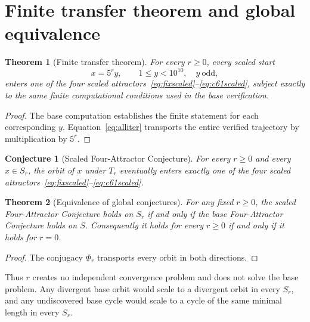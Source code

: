 \documentclass[11pt]{article}
\newtheorem{theorem}{Theorem}
\newtheorem{conjecture}{Conjecture}
\begin{document}
\section{Finite transfer theorem and global equivalence}
\begin{theorem}[Finite transfer theorem]
For every $r\ge0$, every scaled start
\[
x=5^ry,\qquad 1\le y<10^{10},\quad y\ \mathrm{odd},
\]
enters one of the four scaled attractors~\eqref{eq:fixscaled}--\eqref{eq:c61scaled}, subject exactly to the same finite computational conditions used in the base verification.
\end{theorem}
\begin{proof}
The base computation establishes the finite statement for each corresponding $y$. Equation~\eqref{eq:alliter} transports the entire verified trajectory by multiplication by $5^r$.
\end{proof}

\begin{conjecture}[Scaled Four-Attractor Conjecture]
For every $r\ge0$ and every $x\in S_r$, the orbit of $x$ under $T_r$ eventually enters exactly one of the four scaled attractors~\eqref{eq:fixscaled}--\eqref{eq:c61scaled}.
\end{conjecture}

\begin{theorem}[Equivalence of global conjectures]
For any fixed $r\ge0$, the scaled Four-Attractor Conjecture holds on $S_r$ if and only if the base Four-Attractor Conjecture holds on $S$. Consequently it holds for every $r\ge0$ if and only if it holds for $r=0$.
\end{theorem}
\begin{proof}
The conjugacy $\Phi_r$ transports every orbit in both directions.
\end{proof}

Thus $r$ creates no independent convergence problem and does not solve the base problem. Any divergent base orbit would scale to a divergent orbit in every $S_r$, and any undiscovered base cycle would scale to a cycle of the same minimal length in every $S_r$.
\end{document}
